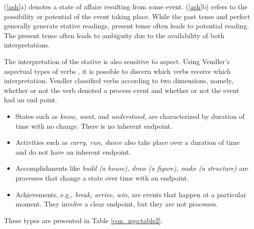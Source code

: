 \documentclass[output=paper]{langscibook}
\begin{document}
\begin{exe}
\ex\label{ash}
\begin{xlist}
\end{xlist}
\end{exe}
(\ref{ash}a) denotes a state of affairs resulting from some event. (\ref{ash}b) refers to the possibility or potential of the event taking place. While the past tense and perfect generally generate stative readings, present tense often leads to potential reading. The present tense often leads to ambiguity due to the availability of both interpretations. 

The interpretation of the stative is also sensitive to aspect. Using Vendler's aspectual types of verbs \citep{vendler67}, it is possible to discern which verbs receive which interpretation. Vendler classified verbs according to two dimensions, namely, whether or not the verb denoted a process event and whether or not the event had an end point.

\begin{itemize}
    \item States such as \textit{know, want}, and \textit{understand}, are characterized by duration of time with no change. There is no inherent endpoint. 
    \item Activities such as \textit{carry, run, dance} also take place over a duration of time and do not have an inherent endpoint.
    \item Accomplishments like \textit{build (a house), draw (a figure), make (a structure)} are processes that change a state over time with an endpoint. 
    \item Achievements, e.g., \textit{break, arrive, win}, are events that happen at a particular moment. They involve a clear endpoint, but they are not processes.
\end{itemize}
These types are presented in Table \ref{con_ngo:table2}. 
\end{document}

